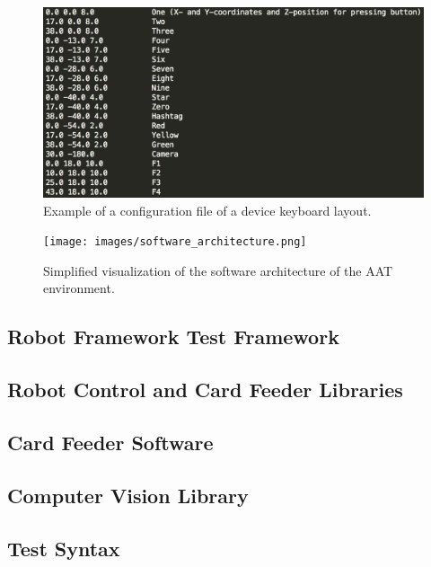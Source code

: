 \begin{figure}[ht]
  \begin{center}
    \includegraphics[width=11	cm]{images/conf2.png}
    \caption{Example of a configuration file of a device keyboard layout.}
    \label{fig:conf2}
  \end{center}
\end{figure}
\FloatBarrier

\begin{figure}[ht]
  \begin{center}
    \texttt{[image: images/software\_architecture.png]}
    \caption{Simplified visualization of the software architecture of the AAT environment.}
    \label{fig:software_architecture}
  \end{center}
\end{figure}
\FloatBarrier

\subsection{Robot Framework Test Framework}
\label{subsection:Robot Framework and libraries}

\subsection{Robot Control and Card Feeder Libraries}
\label{subsection:libraries}

\subsection{Card Feeder Software}
\label{subsection:card feeder software}

\subsection{Computer Vision Library}
\label{subsection:Computer vision library}

\subsection{Test Syntax}
\label{subsection:Test syntax}

